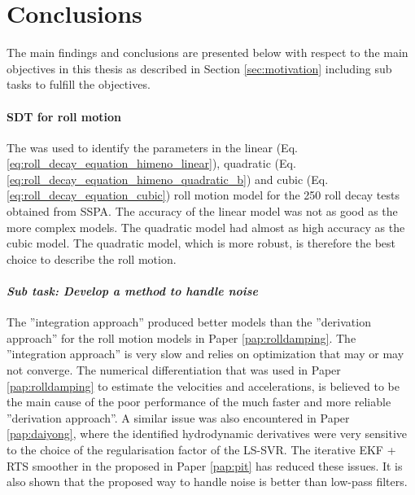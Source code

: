 \chapter{Conclusions\label{ch:conclusions}}
The main findings and conclusions are presented below with respect to the main objectives in this thesis as described in Section \ref{sec:motivation} including sub tasks to fulfill the objectives.

\subsubsection*{SDT for roll motion}
The  was used to identify the parameters in the linear (Eq.\ref{eq:roll_decay_equation_himeno_linear}), quadratic (Eq.\ref{eq:roll_decay_equation_himeno_quadratic_b}) and cubic (Eq.\ref{eq:roll_decay_equation_cubic}) roll motion model for the 250 roll decay tests obtained from SSPA. 
The accuracy of the linear model was not as good as the more complex models. The quadratic model had almost as high accuracy as the cubic model. The quadratic model, which is more robust, is therefore the best choice to describe the roll motion. 

\subsubsection*{\emph{Sub task: Develop a method to handle noise}}
The  ''integration approach'' produced better models than the ''derivation approach'' for the roll motion models in Paper \ref{pap:rolldamping}. The ''integration approach'' is very slow and relies on optimization that may or may not converge.
The numerical differentiation that was used in Paper \ref{pap:rolldamping} to estimate the velocities and accelerations, is believed to be the main cause of the poor performance of the much faster and more reliable ''derivation approach''. A similar issue was also encountered in Paper \ref{pap:daiyong}, where the identified hydrodynamic derivatives were very sensitive to the choice of the regularisation factor of the LS-SVR.
The iterative EKF + RTS smoother in the proposed  in Paper \ref{pap:pit} has reduced these issues. It is also shown that the proposed way to handle noise is better than low-pass filters.

